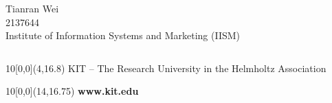 \begin{titlepage}
\begin{center}
        \Large{Tianran Wei}\\
			\Large{2137644}\\
		\vspace*{1cm}
		\Large{
                Institute of Information Systems and Marketing (IISM)
		}
	\end{center}
	\vspace*{1.5cm}
\Large{
\begin{center}
\begin{tabular}[ht]{l c l}

\end{tabular}
\end{center}
}


\begin{center}
\end{center}


\begin{textblock}{10}[0,0](4,16.8)
\tiny{ 
	KIT -- The Research University in the Helmholtz Association
}
\end{textblock}

\begin{textblock}{10}[0,0](14,16.75)
\large{
	\textbf{www.kit.edu} 
}
\end{textblock}

\end{titlepage}
